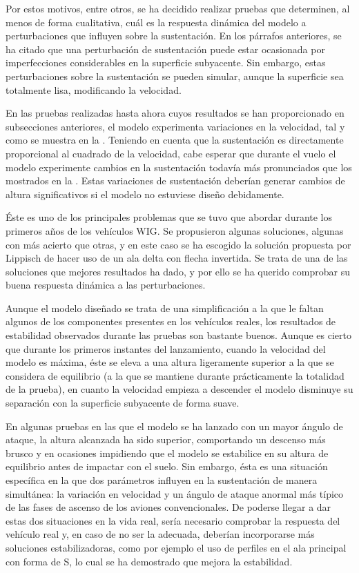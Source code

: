 Por estos motivos, entre otros, se ha decidido realizar pruebas que determinen, al menos de forma cualitativa, cuál es la respuesta dinámica del modelo a perturbaciones que influyen sobre la sustentación. En los párrafos anteriores, se ha citado que una perturbación de sustentación puede estar ocasionada por imperfecciones considerables en la superficie subyacente. Sin embargo, estas perturbaciones sobre la sustentación se pueden simular, aunque la superficie sea totalmente lisa, modificando la velocidad.

En las pruebas realizadas hasta ahora cuyos resultados se han proporcionado en subsecciones anteriores, el modelo experimenta variaciones en la velocidad, tal y como se muestra en la . Teniendo en cuenta que la sustentación es directamente proporcional al cuadrado de la velocidad, cabe esperar que durante el vuelo el modelo experimente cambios en la sustentación todavía más pronunciados que los mostrados en la . Estas variaciones de sustentación deberían generar cambios de altura significativos si el modelo no estuviese diseño debidamente.

Éste es uno de los principales problemas que se tuvo que abordar durante los primeros años de los vehículos WIG. Se propusieron algunas soluciones, algunas con más acierto que otras, y en este caso se ha escogido la solución propuesta por Lippisch de hacer uso de un ala delta con flecha invertida. Se trata de una de las soluciones que mejores resultados ha dado, y por ello se ha querido comprobar su buena respuesta dinámica a las perturbaciones.

Aunque el modelo diseñado se trata de una simplificación a la que le faltan algunos de los componentes presentes en los vehículos reales, los resultados de estabilidad observados durante las pruebas son bastante buenos. Aunque es cierto que durante los primeros instantes del lanzamiento, cuando la velocidad del modelo es máxima, éste se eleva a una altura ligeramente superior a la que se considera de equilibrio (a la que se mantiene durante prácticamente la totalidad de la prueba), en cuanto la velocidad empieza a descender el modelo disminuye su separación con la superficie subyacente de forma suave.

En algunas pruebas en las que el modelo se ha lanzado con un mayor ángulo de ataque, la altura alcanzada ha sido superior, comportando un descenso más brusco y en ocasiones impidiendo que el modelo se estabilice en su altura de equilibrio antes de impactar con el suelo. Sin embargo, ésta es una situación específica en la que dos parámetros influyen en la sustentación de manera simultánea: la variación en velocidad y un ángulo de ataque anormal más típico de las fases de ascenso de los aviones convencionales. De poderse llegar a dar estas dos situaciones en la vida real, sería necesario comprobar la respuesta del vehículo real y, en caso de no ser la adecuada, deberían incorporarse más soluciones estabilizadoras, como por ejemplo el uso de perfiles en el ala principal con forma de S, lo cual se ha demostrado que mejora la estabilidad.\cite{ref:Sshaped}


